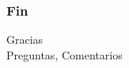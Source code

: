 \documentclass{beamer}
\begin{document}
\section{}

    \begin{frame}
        \frametitle{Fin}
        \centering
        \Huge{Gracias}\\
        \small{Preguntas, Comentarios}

    \end{frame}

\end{document}
